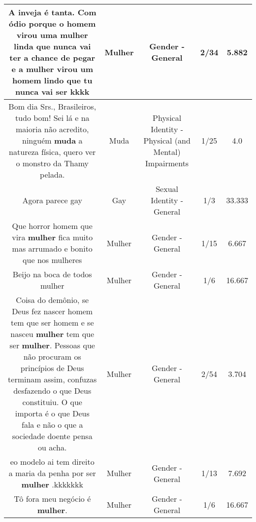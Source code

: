 \documentclass[11pt]{article}
\newlength\mylength
\begin{document}
\begin{center}
\begin{longtable}{|C{.65\mylength}|C{.30\mylength}|C{.12\mylength}|C{.12\mylength}|C{.12\mylength}|}
  \small A inveja é tanta. Com ódio porque o homem virou uma \textbf{mulher} linda que nunca vai ter a chance de pegar e a \textbf{mulher} virou um homem lindo que tu nunca vai ser kkkk\normalsize   & Mulher & Gender - General & 2/34 & 5.882 \\  \hline
  \small Bom dia Srs., Brasileiros,  tudo bom! Sei lá e na maioria não acredito, ninguém \textbf{muda} a natureza física,  quero ver o monstro da Thamy pelada.\normalsize   & Muda & Physical Identity - Physical (and Mental) Impairments & 1/25 & 4.0 \\  \hline
  \small Agora parece gay\normalsize   & Gay & Sexual Identity - General & 1/3 & 33.333 \\  \hline
  \small Que horror homem que vira \textbf{mulher} fica muito mas arrumado e bonito que nos mulheres\normalsize   & Mulher & Gender - General & 1/15 & 6.667 \\  \hline
  \small Beijo na boca de todos mulher\normalsize   & Mulher & Gender - General & 1/6 & 16.667 \\  \hline
  \small Coisa do demônio, se Deus fez nascer homem tem que ser homem e se nasceu \textbf{mulher} tem que ser \textbf{mulher}. Pessoas que não procuram os princípios de Deus terminam assim, confuzas desfazendo o que Deus constituiu. O que importa é o que Deus fala e não o que a sociedade doente pensa ou acha.\normalsize   & Mulher & Gender - General & 2/54 & 3.704 \\  \hline
  \small eo modelo ai tem direito a maria da penha por ser \textbf{mulher} .kkkkkkk\normalsize   & Mulher & Gender - General & 1/13 & 7.692 \\  \hline
  \small Tô fora meu negócio é \textbf{mulher}.\normalsize   & Mulher & Gender - General & 1/6 & 16.667 \\  \hline

\end{longtable}
\end{center}
\end{document}
